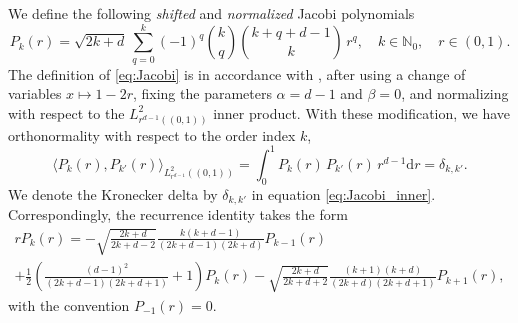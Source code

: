 \documentclass[reqno]{amsart}
\numberwithin{equation}{section}
\numberwithin{figure}{section}
\numberwithin{table}{section}
\theoremstyle{plain}
\theoremstyle{definition}
\theoremstyle{remark}
\newcommand{\inner}[1]{\langle#1\rangle}
\newcommand{\di}{\mathrm{d}}   %
\newcommand{\N}{\mathbb{N}}
\begin{document}
We define the following \emph{shifted} and \emph{normalized} Jacobi polynomials
%
\begin{equation} \label{eq:Jacobi}
    P_k(r) = \sqrt{2k + d} \, \sum^k_{q = 0} (-1)^{q} \binom{k}{q} \binom{k + q + d-1}{k} \, r^q, \quad k \in \N_0, \quad r \in (0, 1).
\end{equation}
%
The definition of \eqref{eq:Jacobi} is in accordance with \cite[\S 18.5(iii)~Eq.~18.5.7]{NIST}, after using a change of variables \( x \mapsto 1 - 2r \), fixing the parameters \( \alpha = d-1 \) and \( \beta = 0 \), and normalizing with respect to the \( L^2_{r^{d-1}((0,1))} \) inner product.
%
With these modification, we have orthonormality with respect to the order index \( k \),
%
\begin{equation} \label{eq:Jacobi_inner}
    \inner{P_k(r), P_{k'}(r)}_{L^2_{r^{d-1}}((0,1))} = \int^1_0 P_k(r) \, P_{k'}(r) \, r^{d-1} \di r = \delta_{k,k'}.
\end{equation}
%
We denote the Kronecker delta by \( \delta_{k,k'} \) in equation \eqref{eq:Jacobi_inner}.
%
Correspondingly, the recurrence identity \cite[\S 18.9(i)~Eq.~18.9.2\_1]{NIST} takes the form
%
\begin{multline} \label{eq:Jacobi_recurrence}
    r P_k(r) = -\sqrt{\frac{2k+d}{2k+d-2}} \frac{k (k + d - 1)}{(2k+d-1)(2k+d)} P_{k-1}(r) \\
    + \frac{1}{2} \left( \frac{(d-1)^2}{(2k+d-1)(2k+d+1)} + 1 \right) P_k(r) 
    - \sqrt{\frac{2k+d}{2k+d+2}} \frac{(k+1) (k+d)}{(2k + d)(2k + d + 1)} P_{k+1}(r),
\end{multline} 
%
with the convention \( P_{-1}(r) = 0 \).
%
\end{document}
